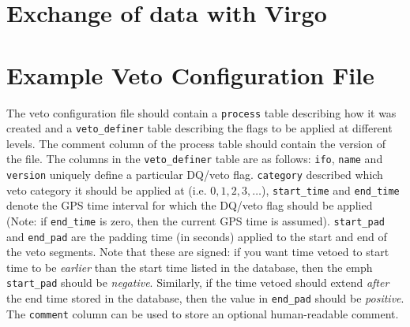 \section{Exchange of data with Virgo}

\section{Example Veto Configuration File}

The veto configuration file should contain a \verb|process| table describing
how it was created and a \verb|veto_definer| table describing the flags to be
applied at different levels. The comment column of the process table should
contain the version of the file. The columns in the \verb|veto_definer| table
are as follows: \verb|ifo|, \verb|name| and \verb|version| uniquely define a
particular DQ/veto flag. \verb|category| described which veto category it
should be applied at (i.e. $0, 1, 2, 3, \ldots$), \verb|start_time| and
\verb|end_time| denote the GPS time interval for which the DQ/veto flag should
be applied (Note: if \verb|end_time| is zero, then the current GPS time is
assumed). \verb|start_pad| and \verb|end_pad| are the padding time (in
seconds) applied to the start and end of the veto segments. Note that these
are signed: if you want time vetoed to start time to be \emph{earlier} than
the start time listed in the database, then the emph \verb|start_pad| should
be \emph{negative}. Similarly, if the time vetoed should extend \emph{after}
the end time stored in the database, then the value in \verb|end_pad| should
be \emph{positive}. The \verb|comment| column can be used to store an optional
human-readable comment.

